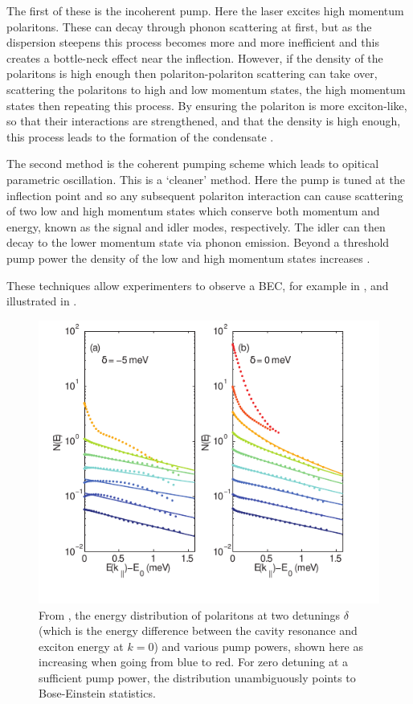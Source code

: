 The first of these is the incoherent pump. Here the laser excites high momentum polaritons. These can decay through phonon scattering at first, but as the dispersion steepens this process becomes more and more inefficient and this creates a bottle-neck effect near the inflection. However, if the density of the polaritons is high enough then polariton-polariton scattering can take over, scattering the polaritons to high and low momentum states, the high momentum states then repeating this process. By ensuring the polariton is more exciton-like, so that their interactions are strengthened, and that the density is high enough, this process leads to the formation of the condensate \cite{doi:10.1080/00107514.2010.550120}.

The second method is the coherent pumping scheme which leads to opitical parametric oscillation. This is a `cleaner' method. Here the pump is tuned at the inflection point and so any subsequent polariton interaction can cause scattering of two low and high momentum states which conserve both momentum and energy, known as the signal and idler modes, respectively. The idler can then decay to the lower momentum state via phonon emission. Beyond a threshold pump power the density of the low and high momentum states increases \cite{doi:10.1080/00107514.2010.550120}.

These techniques allow experimenters to observe a BEC, for example in \cite{PhysRevLett.118.016602}, and illustrated in \fig{\ref{fig:polariton-condesation}}. 

\begin{figure}[htbp!]
	\centering
	\includegraphics[scale=1]{./polaritoncondensation.pdf}
	\caption{From \cite{PhysRevLett.118.016602}, the energy distribution of polaritons at two detunings $\delta$ (which is the energy difference between the cavity resonance and exciton energy at $k=0$) and various pump powers, shown here as increasing when going from blue to red. For zero detuning at a sufficient pump power, the distribution unambiguously points to Bose-Einstein statistics.}
	\label{fig:polariton-condesation}
\end{figure}


